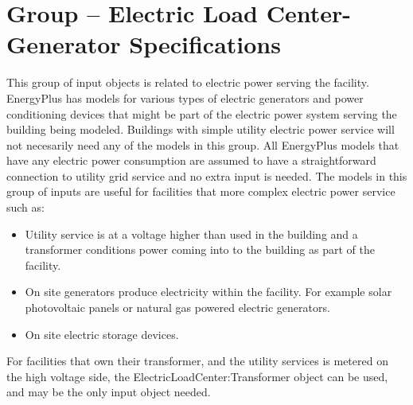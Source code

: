 \section{Group -- Electric Load Center-Generator Specifications}\label{group-electric-load-center-generator-specifications}

This group of input objects is related to electric power serving the facility. EnergyPlus has models for various types of electric generators and power conditioning devices that might be part of the electric power system serving the building being modeled. Buildings with simple utility electric power service will not necesarily need any of the models in this group. All EnergyPlus models that have any electric power consumption are assumed to have a straightforward connection to utility grid service and no extra input is needed. The models in this group of inputs are useful for facilities that more complex electric power service such as:

\begin{itemize}
\tightlist
\item
  Utility service is at a voltage higher than used in the building and a transformer conditions power coming into to the building as part of the facility.
\item
  On site generators produce electricity within the facility. For example solar photovoltaic panels or natural gas powered electric generators.
\item
  On site electric storage devices.
\end{itemize}

For facilities that own their transformer, and the utility services is metered on the high voltage side, the ElectricLoadCenter:Transformer object can be used, and may be the only input object needed.

